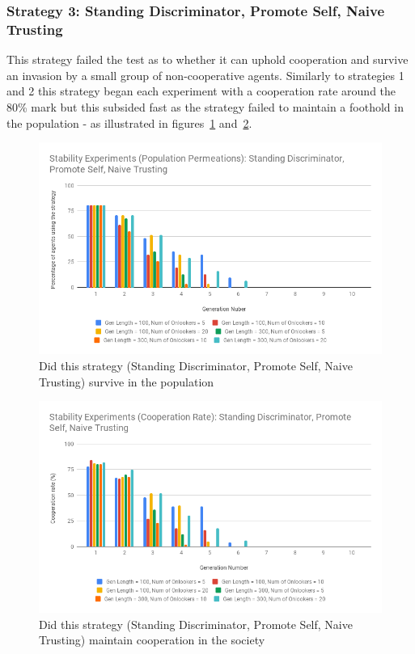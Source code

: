 \documentclass[]{final_report}
\begin{document}
\subsubsection{Strategy 3: Standing Discriminator, Promote Self, Naive Trusting}
This strategy failed the test as to whether it can uphold cooperation and survive an invasion by a small group of non-cooperative agents. Similarly to strategies 1 and 2 this strategy began each experiment with a cooperation rate around the 80\% mark but this subsided fast as the strategy failed to maintain a foothold in the population - as illustrated in figures~\ref{fig:sdpsntStabPop} and~\ref{fig:sdpsntStabCoop}.
\begin{figure}
\begin{framed}
	\includegraphics[width=\textwidth]{sdpsntStabPop.png}
	\caption{Did this strategy (Standing Discriminator, Promote Self, Naive Trusting) survive in the population}
	\label{fig:sdpsntStabPop}
\end{framed}
\end{figure}
\begin{figure}
\begin{framed}
	\includegraphics[width=\textwidth]{sdpsntStabCoop.png}
	\caption{Did this strategy (Standing Discriminator, Promote Self, Naive Trusting) maintain cooperation in the society}
	\label{fig:sdpsntStabCoop}
\end{framed}
\end{figure}
\end{document}
